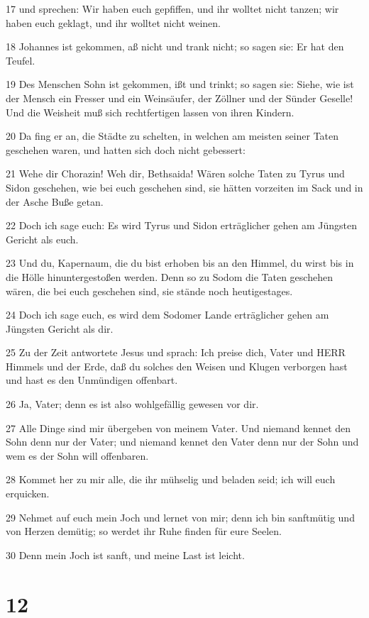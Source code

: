 \par 17 und sprechen: Wir haben euch gepfiffen, und ihr wolltet nicht tanzen; wir haben euch geklagt, und ihr wolltet nicht weinen.
\par 18 Johannes ist gekommen, aß nicht und trank nicht; so sagen sie: Er hat den Teufel.
\par 19 Des Menschen Sohn ist gekommen, ißt und trinkt; so sagen sie: Siehe, wie ist der Mensch ein Fresser und ein Weinsäufer, der Zöllner und der Sünder Geselle! Und die Weisheit muß sich rechtfertigen lassen von ihren Kindern.
\par 20 Da fing er an, die Städte zu schelten, in welchen am meisten seiner Taten geschehen waren, und hatten sich doch nicht gebessert:
\par 21 Wehe dir Chorazin! Weh dir, Bethsaida! Wären solche Taten zu Tyrus und Sidon geschehen, wie bei euch geschehen sind, sie hätten vorzeiten im Sack und in der Asche Buße getan.
\par 22 Doch ich sage euch: Es wird Tyrus und Sidon erträglicher gehen am Jüngsten Gericht als euch.
\par 23 Und du, Kapernaum, die du bist erhoben bis an den Himmel, du wirst bis in die Hölle hinuntergestoßen werden. Denn so zu Sodom die Taten geschehen wären, die bei euch geschehen sind, sie stände noch heutigestages.
\par 24 Doch ich sage euch, es wird dem Sodomer Lande erträglicher gehen am Jüngsten Gericht als dir.
\par 25 Zu der Zeit antwortete Jesus und sprach: Ich preise dich, Vater und HERR Himmels und der Erde, daß du solches den Weisen und Klugen verborgen hast und hast es den Unmündigen offenbart.
\par 26 Ja, Vater; denn es ist also wohlgefällig gewesen vor dir.
\par 27 Alle Dinge sind mir übergeben von meinem Vater. Und niemand kennet den Sohn denn nur der Vater; und niemand kennet den Vater denn nur der Sohn und wem es der Sohn will offenbaren.
\par 28 Kommet her zu mir alle, die ihr mühselig und beladen seid; ich will euch erquicken.
\par 29 Nehmet auf euch mein Joch und lernet von mir; denn ich bin sanftmütig und von Herzen demütig; so werdet ihr Ruhe finden für eure Seelen.
\par 30 Denn mein Joch ist sanft, und meine Last ist leicht.

\chapter{12}

